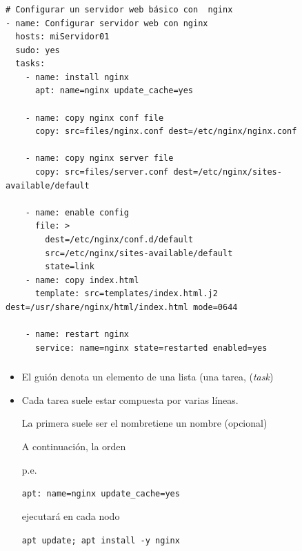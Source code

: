\documentclass[ucs]{beamer}
\begin{document}
\begin{frame}[fragile]
\frametitle{}

  \begin{scriptsize}
  \begin{verbatim}
# Configurar un servidor web básico con  nginx
- name: Configurar servidor web con nginx
  hosts: miServidor01
  sudo: yes
  tasks:
    - name: install nginx
      apt: name=nginx update_cache=yes

    - name: copy nginx conf file
      copy: src=files/nginx.conf dest=/etc/nginx/nginx.conf

    - name: copy nginx server file
      copy: src=files/server.conf dest=/etc/nginx/sites-available/default

    - name: enable config
      file: >
        dest=/etc/nginx/conf.d/default
        src=/etc/nginx/sites-available/default
        state=link
    - name: copy index.html
      template: src=templates/index.html.j2 dest=/usr/share/nginx/html/index.html mode=0644

    - name: restart nginx
      service: name=nginx state=restarted enabled=yes
  \end{verbatim}
  \end{scriptsize}
\end{frame}


\begin{frame}[fragile]
\frametitle{}
\begin{itemize}
\item
El guión denota un elemento de una lista (una tarea, (\emph{task})

\item
Cada tarea suele estar compuesta por varias líneas.

La primera suele ser el nombretiene un nombre (opcional)

A continuación, la orden


p.e.

\verb|apt: name=nginx update_cache=yes|

ejecutará en cada nodo

\verb|apt update; apt install -y nginx|


\end{itemize}

\end{frame}
\end{document}
